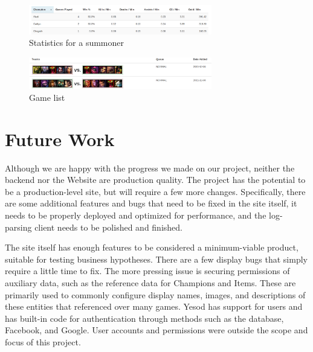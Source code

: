 \documentclass[letterpaper,twocolumn,9pt]{article}
\begin{document}
\begin{figure}[h]
    \includegraphics[width=80mm]{imgs/stats.png}
    \caption{Statistics for a summoner}
    \label{stats}
\end{figure}

\begin{figure}[h]
    \includegraphics[width=80mm]{imgs/gamelist.png}
    \caption{Game list}
    \label{list}
\end{figure}

\section{Future Work}
\label{future}

Although we are happy with the progress we made on our project, neither the backend nor the Website are production quality.   The project has the potential to be a production-level site, but will require a few more changes.  Specifically, there are some additional features and bugs that need to be fixed in the site itself, it needs to be properly deployed and optimized for performance, and the log-parsing client needs to be polished and finished.

The site itself has enough features to be considered a minimum-viable product, suitable for testing business hypotheses.  There are a few display bugs that simply require a little time to fix.  The more pressing issue is securing permissions of auxiliary data, such as the reference data for Champions and Items.  These are primarily used to commonly configure display names, images, and descriptions of these entities that referenced over many games.  Yesod has support for users and has built-in code for authentication through methods such as the database, Facebook, and Google.  User accounts and permissions were outside the scope and focus of this project.
\end{document}
